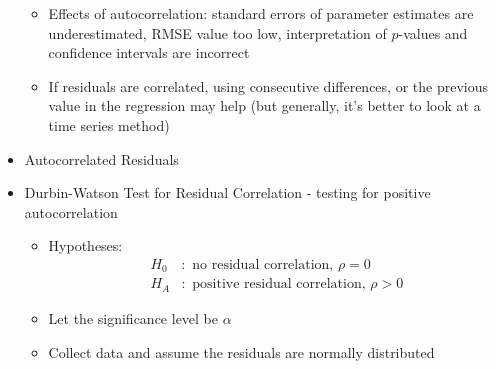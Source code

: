 \documentclass[12pt]{article}
\begin{document}
\begin{itemize}
\begin{itemize}
\item Effects of autocorrelation: standard errors of parameter estimates are underestimated, RMSE value too low, interpretation of $p$-values and confidence intervals are incorrect 
\item If residuals are correlated, using consecutive differences, or the previous value in the regression may help (but generally, it's better to look at a time series method) \end{itemize} 
\item Autocorrelated Residuals 
\item Durbin-Watson Test for Residual Correlation - testing for positive autocorrelation \begin{itemize} 
\item Hypotheses: $$ \begin{aligned} H_0 &: \text{ no residual correlation, } \rho = 0 \\ H_A &: \text{ positive residual correlation, } \rho > 0 \end{aligned} $$ 
\item Let the significance level be $\alpha$
\item Collect data and assume the residuals are normally distributed 

\end{itemize}
\end{itemize}
\end{document}
